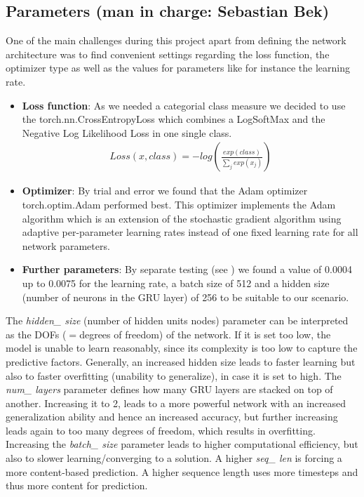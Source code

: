 \documentclass[11pt,a4paper,bibliography=totocnumbered,listof=totocnumbered]{scrartcl}
\begin{document}
\subsection{Parameters \small{(man in charge: Sebastian Bek)}}
One of the main challenges during this project apart from defining the network architecture was to find convenient settings regarding the loss function, the optimizer type as well as the values for parameters like for instance the learning rate.  
\begin{itemize}
	\item \textbf{Loss function}: As we needed a categorial class measure we decided to use the torch.nn.CrossEntropyLoss which combines a LogSoftMax and the Negative Log Likelihood Loss in one single class. 
	\begin{align*}
		Loss(x, class) = -log \left( \frac{exp(class)}{\sum_j exp(x_j)} \right)
	\end{align*}	 

	\item \textbf{Optimizer}: By trial and error we found that the Adam optimizer torch.optim.Adam performed best. This optimizer implements the Adam algorithm which is an extension of the stochastic gradient algorithm using adaptive per-parameter learning rates instead of one fixed learning rate for all network parameters. 
	
	\item \textbf{Further parameters}: By separate testing (see ) we found a value of 0.0004 up to 0.0075 for the learning rate, a batch size of 512 and a hidden size (number of neurons in the GRU layer) of 256 to be suitable to our scenario. 
\end{itemize}

The \textit{hidden\_ size} (number of hidden units\/ nodes) parameter can be interpreted as the DOFs ($=$degrees of freedom) of the network. If it is set too low, the model is unable to learn reasonably, since its complexity is too low to capture the predictive factors. Generally, an increased hidden size leads to faster learning but also to faster overfitting (unability to generalize), in case it is set to high. The \textit{num\_ layers} parameter defines how many GRU layers are stacked on top of another. Increasing it to 2, leads to a more powerful network with an increased generalization ability and hence an increased accuracy, but further increasing leads again to too many degrees of freedom, which results in overfitting. Increasing the \textit{batch\_ size} parameter leads to higher computational efficiency, but also to slower learning/converging to a solution. A higher \textit{seq\_ len} is forcing a more content-based prediction. A higher sequence length uses more timesteps and thus more content for prediction.
\end{document}
